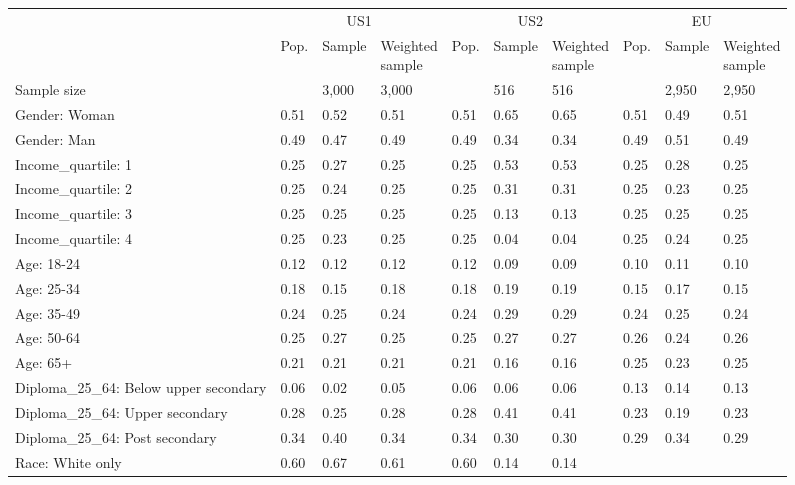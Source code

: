 
\begin{tabular}[t]{llllllllll}
\toprule
\multicolumn{1}{c}{} & \multicolumn{3}{c}{US1} & \multicolumn{3}{c}{US2} & \multicolumn{3}{c}{EU} \\
\cmidrule(l{3pt}r{3pt}){2-4} \cmidrule(l{3pt}r{3pt}){5-7} \cmidrule(l{3pt}r{3pt}){8-10}
  & Pop. & Sample & \makecell{Weighted\\sample} & Pop. & Sample & \makecell{Weighted\\sample} & Pop. & Sample & \makecell{Weighted\\sample}\\
\midrule
Sample size &  & 3,000 & 3,000 &  & 516 & 516 &  & 2,950 & 2,950\\
\addlinespace
Gender: Woman & 0.51 & 0.52 & 0.51 & 0.51 & 0.65 & 0.65 & 0.51 & 0.49 & 0.51\\
Gender: Man & 0.49 & 0.47 & 0.49 & 0.49 & 0.34 & 0.34 & 0.49 & 0.51 & 0.49\\
\addlinespace
Income\_quartile: 1 & 0.25 & 0.27 & 0.25 & 0.25 & 0.53 & 0.53 & 0.25 & 0.28 & 0.25\\
Income\_quartile: 2 & 0.25 & 0.24 & 0.25 & 0.25 & 0.31 & 0.31 & 0.25 & 0.23 & 0.25\\
Income\_quartile: 3 & 0.25 & 0.25 & 0.25 & 0.25 & 0.13 & 0.13 & 0.25 & 0.25 & 0.25\\
Income\_quartile: 4 & 0.25 & 0.23 & 0.25 & 0.25 & 0.04 & 0.04 & 0.25 & 0.24 & 0.25\\
\addlinespace
Age: 18-24 & 0.12 & 0.12 & 0.12 & 0.12 & 0.09 & 0.09 & 0.10 & 0.11 & 0.10\\
Age: 25-34 & 0.18 & 0.15 & 0.18 & 0.18 & 0.19 & 0.19 & 0.15 & 0.17 & 0.15\\
Age: 35-49 & 0.24 & 0.25 & 0.24 & 0.24 & 0.29 & 0.29 & 0.24 & 0.25 & 0.24\\
Age: 50-64 & 0.25 & 0.27 & 0.25 & 0.25 & 0.27 & 0.27 & 0.26 & 0.24 & 0.26\\
Age: 65+ & 0.21 & 0.21 & 0.21 & 0.21 & 0.16 & 0.16 & 0.25 & 0.23 & 0.25\\
\addlinespace
Diploma\_25\_64: Below upper secondary & 0.06 & 0.02 & 0.05 & 0.06 & 0.06 & 0.06 & 0.13 & 0.14 & 0.13\\
Diploma\_25\_64: Upper secondary & 0.28 & 0.25 & 0.28 & 0.28 & 0.41 & 0.41 & 0.23 & 0.19 & 0.23\\
Diploma\_25\_64: Post secondary & 0.34 & 0.40 & 0.34 & 0.34 & 0.30 & 0.30 & 0.29 & 0.34 & 0.29\\
\addlinespace
Race: White only & 0.60 & 0.67 & 0.61 & 0.60 & 0.14 & 0.14 &  &  & \\

\end{tabular}
